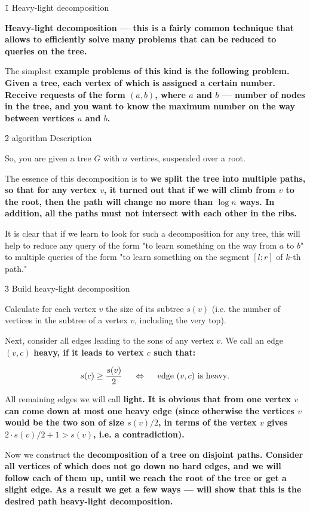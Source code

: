 \h1{ Heavy-light decomposition }

\bf{Heavy-light decomposition} --- this is a fairly common technique that allows to efficiently solve many problems that can be reduced to \bf{queries on the tree}.

The simplest \bf{example} problems of this kind is the following problem. Given a tree, each vertex of which is assigned a certain number. Receive requests of the form $(a,b)$, where $a$ and $b$ --- number of nodes in the tree, and you want to know the maximum number on the way between vertices $a$ and $b$.


\h2{ algorithm Description }

So, you are given a tree $G$ with $n$ vertices, suspended over a root.

The essence of this decomposition is to \bf{we split the tree into multiple paths}, so that for any vertex $v$, it turned out that if we will climb from $v$ to the root, then the path will change no more than $\log n$ ways. In addition, all the paths must not intersect with each other in the ribs.

It is clear that if we learn to look for such a decomposition for any tree, this will help to reduce any query of the form "to learn something on the way from $a$ to $b$" to multiple queries of the form "to learn something on the segment $[l;r]$ of $k$-th path."


\h3{ Build heavy-light decomposition }

Calculate for each vertex $v$ the size of its subtree $s(v)$ (i.e. the number of vertices in the subtree of a vertex $v$, including the very top).

Next, consider all edges leading to the sons of any vertex $v$. We call an edge $(v,c)$ \bf{heavy}, if it leads to vertex $c$ such that:

$$ s(c) \ge \frac{ s(v) }{ 2 } ~~~~ \Leftrightarrow ~~~~ {\rm edge} ~ (v,c) ~ {\rm is ~ heavy}. $$

All remaining edges we will call \bf{light}. It is obvious that from one vertex $v$ can come down at most one heavy edge (since otherwise the vertices $v$ would be the two son of size $s(v)/2$, in terms of the vertex $v$ gives $2 \cdot s(v) / 2 + 1 > s(v)$, i.e. a contradiction).

Now we construct the \bf{decomposition} of a tree on disjoint paths. Consider all vertices of which does not go down no hard edges, and we will follow each of them up, until we reach the root of the tree or get a slight edge. As a result we get a few ways --- will show that this is the desired path heavy-light decomposition.


